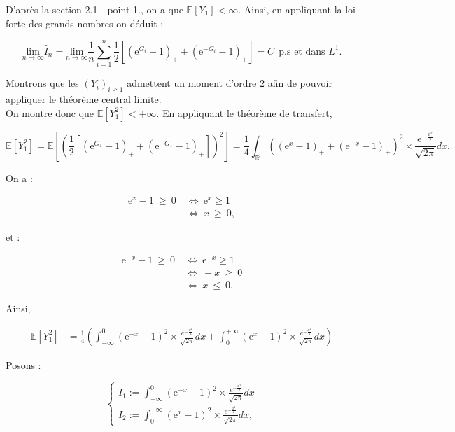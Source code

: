 \documentclass{article}
\theoremstyle{exostyle}
\newenvironment{questions}{
\begin{enumerate}[\hspace{12pt} 1.]}{\end{enumerate}}
\begin{document}
\begin{questions}
D'après la section 2.1 - point 1., on a que $\mathbb{E} [Y_{1} ] < \infty$. Ainsi, en appliquant la loi forte des grands nombres on déduit :

\[\underset{n \to \infty}{\text{lim}} \hat{I}_{n} = \underset{n \to \infty}{\text{lim}} \frac{1}{n} \sum_{i=1}^{n} \frac{1}{2} \left[ \left( \text{e}^{G_{i}}-1 \right)_{+} + \left( \text{e}^{-G_{i}}-1\right)_{+} \right] = C \ \ \text{p.s et dans $L^{1}$}.\]

Montrons que les $(Y_{i})_{i \geq 1}$ admettent un moment d'ordre $2$ afin de pouvoir appliquer le théorème central limite.\\
On montre donc que $\mathbb{E}[Y_{1}^{2}] < + \infty$. En appliquant le théorème de transfert,

\[\mathbb{E}[Y_{1}^{2}] = \mathbb{E} \left[\left( \frac{1}{2} \left[ \left( \text{e}^{G_{1}}-1 \right)_{+} + \left( \text{e}^{-G_{1}}-1 \right)_{+} \right] \right)^{2}  \right] = \frac{1}{4} \int_{\mathbb{R}} \left( \left(\text{e}^{x}-1 \right)_{+} + \left(\text{e}^{-x}-1 \right)_{+} \right)^{2} \times \frac{\text{e}^{-\frac{x^{2}}{2}}}{\sqrt{2\pi}}dx.\]

On a :


\begin{align*}
    \text{e}^{x}-1 \ \geq \ 0 \ &\Leftrightarrow \ \text{e}^{x} \geq 1\\
    &\Leftrightarrow \ x \ \geq \ 0,
\end{align*}

et : 

\begin{align*}
    \text{e}^{-x}-1 \ \geq \ 0 \ &\Leftrightarrow \ \text{e}^{-x} \geq 1\\
    &\Leftrightarrow \ -x \ \geq \ 0\\
    &\Leftrightarrow \ x \ \leq \ 0.
\end{align*}

Ainsi, 

\begin{align*}
    \mathbb{E}\left[ Y_{1}^{2} \right] &= \frac{1}{4} \left( \int_{-\infty}^{0} \left(\text{e}^{-x}-1\right)^{2} \times \frac{e^{-\frac{x^{2}}{2}}}{\sqrt{2\pi}}dx + \int_{0}^{+\infty} \left(\text{e}^{x}-1\right)^{2} \times \frac{e^{-\frac{x^{2}}{2}}}{\sqrt{2\pi}}dx \right)
\end{align*}

Posons : 

\[\left\{
  \begin{array}{lll}
    I_{1} := \int_{-\infty}^{0} \left(\text{e}^{-x}-1\right)^{2} \times \frac{e^{-\frac{x^{2}}{2}}}{\sqrt{2\pi}}dx\\
    I_{2} := \int_{0}^{+\infty} \left(\text{e}^{x}-1\right)^{2} \times \frac{e^{-\frac{x^{2}}{2}}}{\sqrt{2\pi}}dx,
\end{array}
\right.\]


\end{questions}
\end{document}

